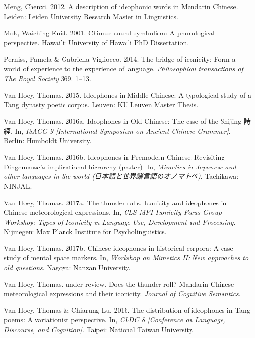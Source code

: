 \documentclass[12pt,]{article}
\theoremstyle{definition}
\theoremstyle{definition}
\theoremstyle{definition}
\theoremstyle{remark}
\begin{document}
\hypertarget{ref-Meng2012}{}
Meng, Chenxi. 2012. A description of ideophonic words in Mandarin
Chinese. Leiden: Leiden University Research Master in Linguistics.

\hypertarget{ref-Mok2001}{}
Mok, Waiching Enid. 2001. Chinese sound symbolism: A phonological
perspective. Hawai'i: University of Hawai'i PhD Dissertation.

\hypertarget{ref-Perniss2014}{}
Perniss, Pamela \& Gabriella Vigliocco. 2014. The bridge of iconicity:
Form a world of experience to the experience of language.
\emph{Philosophical transactions of The Royal Society} 369. 1--13.

\hypertarget{ref-VanHoey2015}{}
Van Hoey, Thomas. 2015. Ideophones in Middle Chinese: A typological
study of a Tang dynasty poetic corpus. Leuven: KU Leuven Master Thesis.

\hypertarget{ref-VanHoey2016a}{}
Van Hoey, Thomas. 2016a. Ideophones in Old Chinese: The case of the
Shijing 詩經. In, \emph{ISACG 9 {[}International Symposium on Ancient
Chinese Grammar{]}}. Berlin: Humboldt University.

\hypertarget{ref-VanHoey2016b}{}
Van Hoey, Thomas. 2016b. Ideophones in Premodern Chinese: Revisiting
Dingemanse's implicational hierarchy (poster). In, \emph{Mimetics in
Japanese and other languages in the world
(日本語と世界諸言語のオノマトペ)}. Tachikawa: NINJAL.

\hypertarget{ref-VanHoey2017}{}
Van Hoey, Thomas. 2017a. The thunder rolls: Iconicity and ideophones in
Chinese meteorological expressions. In, \emph{CLS-MPI Iconicity Focus
Group Workshop: Types of Iconicity in Language Use, Development and
Processing}. Nijmegen: Max Planck Institute for Psycholinguistics.

\hypertarget{ref-VanHoey2017a}{}
Van Hoey, Thomas. 2017b. Chinese ideophones in historical corpora: A
case study of mental space markers. In, \emph{Workshop on Mimetics II:
New approaches to old questions}. Nagoya: Nanzan University.

\hypertarget{ref-VanHoeyunderreviewa}{}
Van Hoey, Thomas. under review. Does the thunder roll? Mandarin Chinese
meteorological expressions and their iconicity. \emph{Journal of
Cognitive Semantics}.

\hypertarget{ref-VanHoey2016c}{}
Van Hoey, Thomas \& Chiarung Lu. 2016. The distribution of ideophones in
Tang poems: A variationist perspective. In, \emph{CLDC 8 {[}Conference
on Language, Discourse, and Cognition{]}}. Taipei: National Taiwan
University.
\end{document}
